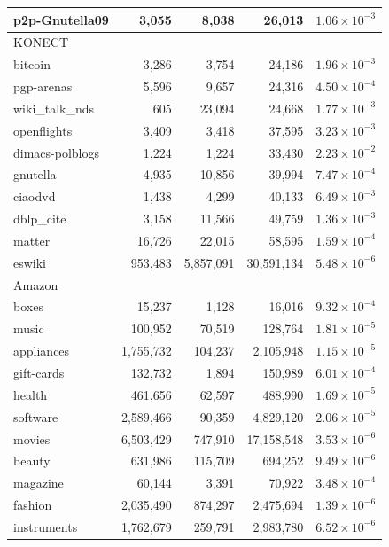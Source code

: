 \documentclass{article}
\begin{document}
\begin{longtable}{lrrrr}
p2p-Gnutella09 & 3{,}055 & 8{,}038 & 26{,}013 & $1.06\times 10^{-3}$ \\
\midrule
\multicolumn{5}{l}{KONECT} \\
\midrule
bitcoin & 3{,}286 & 3{,}754 & 24{,}186 & $1.96\times 10^{-3}$ \\
pgp-arenas & 5{,}596 & 9{,}657 & 24{,}316 & $4.50\times 10^{-4}$ \\
wiki\_talk\_nds & 605 & 23{,}094 & 24{,}668 & $1.77\times 10^{-3}$ \\
openflights & 3{,}409 & 3{,}418 & 37{,}595 & $3.23\times 10^{-3}$ \\
dimacs-polblogs & 1{,}224 & 1{,}224 & 33{,}430 & $2.23\times 10^{-2}$ \\
gnutella & 4{,}935 & 10{,}856 & 39{,}994 & $7.47\times 10^{-4}$ \\
ciaodvd & 1{,}438 & 4{,}299 & 40{,}133 & $6.49\times 10^{-3}$ \\
dblp\_cite & 3{,}158 & 11{,}566 & 49{,}759 & $1.36\times 10^{-3}$ \\
matter & 16{,}726 & 22{,}015 & 58{,}595 & $1.59\times 10^{-4}$ \\
eswiki & 953{,}483 & 5{,}857{,}091 & 30{,}591{,}134 & $5.48\times 10^{-6}$ \\
\midrule
\multicolumn{5}{l}{Amazon} \\
\midrule
boxes & 15{,}237 & 1{,}128 & 16{,}016 & $9.32\times 10^{-4}$ \\
music & 100{,}952 & 70{,}519 & 128{,}764 & $1.81\times 10^{-5}$ \\
appliances & 1{,}755{,}732 & 104{,}237 & 2{,}105{,}948 & $1.15\times 10^{-5}$ \\
gift-cards & 132{,}732 & 1{,}894 & 150{,}989 & $6.01\times 10^{-4}$ \\
health & 461{,}656 & 62{,}597 & 488{,}990 & $1.69\times 10^{-5}$ \\
software & 2{,}589{,}466 & 90{,}359 & 4{,}829{,}120 & $2.06\times 10^{-5}$ \\
movies & 6{,}503{,}429 & 747{,}910 & 17{,}158{,}548 & $3.53\times 10^{-6}$ \\
beauty & 631{,}986 & 115{,}709 & 694{,}252 & $9.49\times 10^{-6}$ \\
magazine & 60{,}144 & 3{,}391 & 70{,}922 & $3.48\times 10^{-4}$ \\
fashion & 2{,}035{,}490 & 874{,}297 & 2{,}475{,}694 & $1.39\times 10^{-6}$ \\
instruments & 1{,}762{,}679 & 259{,}791 & 2{,}983{,}780 & $6.52\times 10^{-6}$ \\
\end{longtable}
\end{document}
